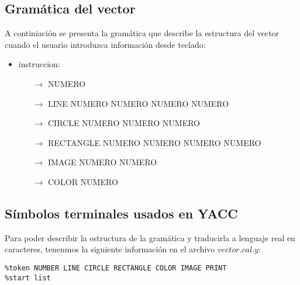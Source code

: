 \subsection{Gramática del vector}
\label{gram:vector}
A continiación se presenta la gramática que describe la estructura del vector cuando el 
usuario introduzca información desde teclado:
\begin{itemize}
	\item instruccion:
	\begin{itemize}
		\item[$\rightarrow$] NUMERO 
		\item[$\rightarrow$] LINE NUMERO NUMERO NUMERO NUMERO
		\item[$\rightarrow$] CIRCLE NUMERO NUMERO NUMERO
		\item[$\rightarrow$] RECTANGLE NUMERO NUMERO NUMERO NUMERO 
		\item[$\rightarrow$] IMAGE NUMERO NUMERO
		\item[$\rightarrow$] COLOR NUMERO
				
	\end{itemize}
\end{itemize}

\subsection{Símbolos terminales usados en YACC}
Para poder describir la estructura de la gramática y traducirla a lenguaje real en
caracteres, tenenmos la siguiente información en el archivo \texttt{$vector.cal.y$}:

\begin{lstlisting}
%token NUMBER LINE CIRCLE RECTANGLE COLOR IMAGE PRINT
%start list
\end{lstlisting}

